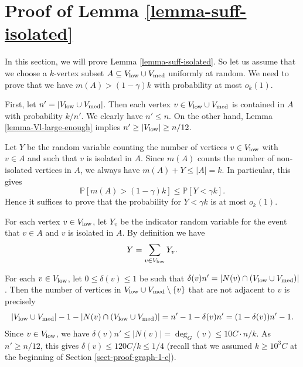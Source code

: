 \section{Proof of Lemma \ref{lemma-suff-isolated}}\label{sect-suff-isolated}

In this section, we will prove Lemma \ref{lemma-suff-isolated}. So let us assume that we choose a $k$-vertex subset $A\subseteq V_{\textnormal{low}}\cup V_{\textnormal{med}}$ uniformly at random. We need to prove that we have $m(A)>(1-\gamma)k$ with probability at most $o_k(1)$. 

First, let $n'=\vert V_{\textnormal{low}}\cup V_{\textnormal{med}}\vert$. Then each vertex $v\in V_{\textnormal{low}}\cup V_{\textnormal{med}}$ is contained in $A$ with probability $k/n'$. We clearly have $n'\leq n$. On the other hand, Lemma \ref{lemma-Vl-large-enough} implies $n'\geq \vert V_{\textnormal{low}}\vert\geq n/12$.

Let $Y$ be the random variable counting the number of vertices $v\in V_{\textnormal{low}}$ with $v\in A$ and such that $v$ is isolated in $A$. Since $m(A)$ counts the number of non-isolated vertices in $A$, we always have $m(A)+Y\leq \vert A\vert = k$. In particular, this gives
\[\mathbb{P}[m(A)>(1-\gamma)k]\leq \mathbb{P}[Y<\gamma k].\]
Hence it suffices to prove that the probability for $Y<\gamma k$ is at most $o_k(1)$.

For each vertex $v\in V_{\textnormal{low}}$, let $Y_v$ be the indicator random variable for the event that $v\in A$ and $v$ is isolated in $A$. By definition we have
\[Y=\sum_{v\in V_{\textnormal{low}}}Y_v.\]

For each $v\in V_{\textnormal{low}}$, let $0\leq \delta(v)\leq 1$ be such that $\delta(v)n'=\vert N(v)\cap (V_{\textnormal{low}}\cup V_{\textnormal{med}})\vert$. Then the number of vertices in $V_{\textnormal{low}}\cup V_{\textnormal{med}}\setminus \lbrace v\rbrace$ that are not adjacent to $v$ is precisely
\[\vert V_{\textnormal{low}}\cup V_{\textnormal{med}}\vert-1-\vert N(v)\cap (V_{\textnormal{low}}\cup V_{\textnormal{med}})\vert=n'-1-\delta(v) n'=(1-\delta(v))n'-1.\]
Since $v\in V_{\textnormal{low}}$, we have $\delta(v)n'\leq \vert N(v)\vert=\deg_G(v)\leq 10C\cdot n/k$. As $n'\geq n/12$, this gives $\delta(v)\leq 120C/k\leq 1/4$ (recall that we assumed $k\geq 10^3C$ at the beginning of Section \ref{sect-proof-graph-1-e}).

